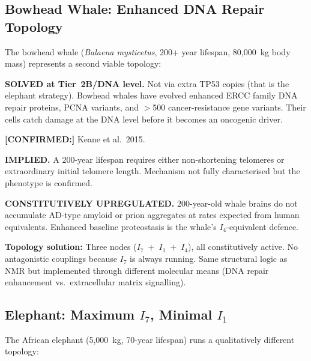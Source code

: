\documentclass[12pt,a4paper]{article}
\newcommand{\confirmed}[1]{\noindent\colorbox{green!10}{\parbox{\dimexpr\linewidth-2\fboxsep}{%
  \textbf{[CONFIRMED:]} #1}}\vspace{0.4em}}
\newcommand{\Inet}[1]{$I_{#1}$}
\begin{document}
\subsection{Bowhead Whale: Enhanced DNA Repair Topology}

The bowhead whale (\textit{Balaena mysticetus}, 200+ year lifespan,
80,000~kg body mass) represents a second viable topology:

\begin{description}[leftmargin=2em]
  \item[\Inet{7} (cancer surveillance):] \textbf{SOLVED at Tier~2B/DNA level.}
    Not via extra TP53 copies (that is the elephant strategy). Bowhead whales
    have evolved enhanced ERCC family DNA repair proteins, PCNA variants, and
    $>$500 cancer-resistance gene variants. Their cells catch damage at the
    DNA level before it becomes an oncogenic driver.
    \confirmed{Keane et al.\ 2015.}

  \item[\Inet{1} (telomere):] \textbf{IMPLIED.} A 200-year lifespan requires
    either non-shortening telomeres or extraordinary initial telomere length.
    Mechanism not fully characterised but the phenotype is confirmed.

  \item[\Inet{4} (proteostasis):] \textbf{CONSTITUTIVELY UPREGULATED.}
    200-year-old whale brains do not accumulate AD-type amyloid or prion
    aggregates at rates expected from human equivalents. Enhanced baseline
    proteostasis is the whale's \Inet{4}-equivalent defence.
\end{description}

\textbf{Topology solution:} Three nodes (\Inet{7}~+~\Inet{1}~+~\Inet{4}),
all constitutively active. No antagonistic couplings because \Inet{7} is
always running. Same structural logic as NMR but implemented through different
molecular means (DNA repair enhancement vs.\ extracellular matrix signalling).

\subsection{Elephant: Maximum \texorpdfstring{\Inet{7}}{I7}, Minimal
\texorpdfstring{\Inet{1}}{I1}}

The African elephant (5,000~kg, 70-year lifespan) runs a qualitatively
different topology:
\end{document}
